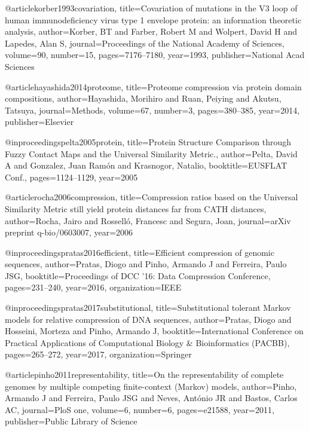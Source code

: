 @article{korber1993covariation,
  title={Covariation of mutations in the V3 loop of human immunodeficiency virus type 1 envelope protein: an information theoretic analysis},
  author={Korber, BT and Farber, Robert M and Wolpert, David H and Lapedes, Alan S},
  journal={Proceedings of the National Academy of Sciences},
  volume={90},
  number={15},
  pages={7176--7180},
  year={1993},
  publisher={National Acad Sciences}
}

@article{hayashida2014proteome,
  title={Proteome compression via protein domain compositions},
  author={Hayashida, Morihiro and Ruan, Peiying and Akutsu, Tatsuya},
  journal={Methods},
  volume={67},
  number={3},
  pages={380--385},
  year={2014},
  publisher={Elsevier}
}

@inproceedings{pelta2005protein,
  title={Protein Structure Comparison through Fuzzy Contact Maps and the Universal Similarity Metric.},
  author={Pelta, David A and Gonzalez, Juan Ram{\'o}n and Krasnogor, Natalio},
  booktitle={EUSFLAT Conf.},
  pages={1124--1129},
  year={2005}
}

@article{rocha2006compression,
  title={Compression ratios based on the Universal Similarity Metric still yield protein distances far from {CATH} distances},
  author={Rocha, Jairo and Rossell{\'o}, Francesc and Segura, Joan},
  journal={arXiv preprint q-bio/0603007},
  year={2006}
}

@inproceedings{pratas2016efficient,
  title={Efficient compression of genomic sequences},
  author={Pratas, Diogo and Pinho, Armando J and Ferreira, Paulo JSG},
  booktitle={Proceedings of DCC '16: Data Compression Conference},
  pages={231--240},
  year={2016},
  organization={IEEE}
}

@inproceedings{pratas2017substitutional,
  title={Substitutional tolerant {Markov} models for relative compression of {DNA} sequences},
  author={Pratas, Diogo and Hosseini, Morteza and Pinho, Armando J},
  booktitle={International Conference on Practical Applications of Computational Biology \& Bioinformatics (PACBB)},
  pages={265--272},
  year={2017},
  organization={Springer}
}

@article{pinho2011representability,
  title={On the representability of complete genomes by multiple competing finite-context ({Markov}) models},
  author={Pinho, Armando J and Ferreira, Paulo JSG and Neves, Ant{\'o}nio JR and Bastos, Carlos AC},
  journal={PloS one},
  volume={6},
  number={6},
  pages={e21588},
  year={2011},
  publisher={Public Library of Science}
}

